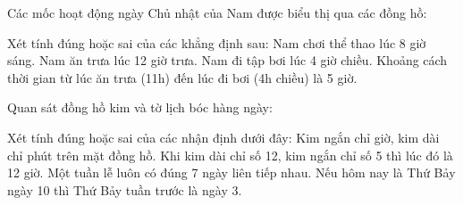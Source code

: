 \begin{ex} %
Các mốc hoạt động ngày Chủ nhật của Nam được biểu thị qua các đồng hồ:
\begin{center}\vspace{-3mm}
\vspace{-3mm}\end{center}
Xét tính đúng hoặc sai của các khẳng định sau:
\choiceTF
{\True Nam chơi thể thao lúc 8 giờ sáng.}
{Nam ăn trưa lúc 12 giờ trưa.}
{\True Nam đi tập bơi lúc 4 giờ chiều.}
{\True Khoảng cách thời gian từ lúc ăn trưa (11h) đến lúc đi bơi (4h chiều) là 5 giờ.}
\end{ex}

\begin{ex} %
Quan sát đồng hồ kim và tờ lịch bóc hàng ngày:
\begin{center}\vspace{-3mm}
\vspace{-3mm}\end{center}
Xét tính đúng hoặc sai của các nhận định dưới đây:
\choiceTF
{\True Kim ngắn chỉ giờ, kim dài chỉ phút trên mặt đồng hồ.}
{Khi kim dài chỉ số 12, kim ngắn chỉ số 5 thì lúc đó là 12 giờ.}
{\True Một tuần lễ luôn có đúng 7 ngày liên tiếp nhau.}
{\True Nếu hôm nay là Thứ Bảy ngày 10 thì Thứ Bảy tuần trước là ngày 3.}
\end{ex}

\newpage

